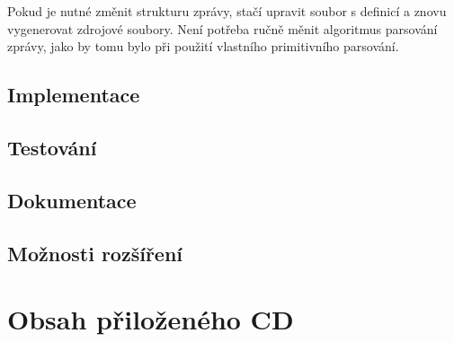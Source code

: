 \documentclass[thesis=B,czech,hidelinks]{FITthesis}[2012/06/26] %
\begin{document}
Pokud je nutné změnit strukturu zprávy, stačí upravit soubor s definicí a znovu vygenerovat zdrojové soubory. Není potřeba ručně měnit algoritmus parsování zprávy, jako by tomu bylo při použití vlastního primitivního parsování.

\section{Implementace}



\section{Testování}
\label{section:testing}


\section{Dokumentace}

\section{Možnosti rozšíření}

\begin{conclusion}
	
	
\end{conclusion}




\appendix


\chapter{Obsah přiloženého CD}


\begin{figure}
\end{figure}
\end{document}
